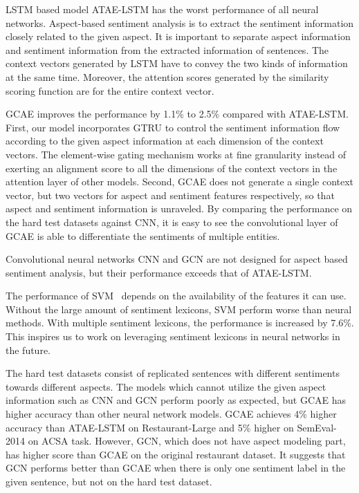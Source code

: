 \documentclass[11pt,a4paper]{article}
\begin{document}
LSTM based model ATAE-LSTM has the worst performance of all neural networks. Aspect-based sentiment analysis is to extract the sentiment information closely related to the given aspect. It is important to separate aspect information and sentiment information from the extracted information of sentences. The context vectors generated by LSTM have to convey the two kinds of information at the same time. Moreover, the attention scores generated by the similarity scoring function are for the entire context vector. 

GCAE improves the performance by 1.1\% to 2.5\% compared with ATAE-LSTM. 
First, our model incorporates GTRU to control the sentiment information flow according to the given aspect information at each dimension of the context vectors. The element-wise gating mechanism works at fine granularity instead of exerting an alignment score to all the dimensions of the context vectors in the attention layer of other models.
Second, GCAE does not generate a single context vector, but two vectors for aspect and sentiment features respectively, so that aspect and sentiment information is unraveled. 
By comparing the performance on the hard test datasets against CNN, it is easy to see the convolutional layer of GCAE is able to differentiate the sentiments of multiple entities. 

Convolutional neural networks CNN and GCN are not designed for aspect based sentiment analysis, but their performance exceeds that of ATAE-LSTM.

The performance of SVM~\cite{Kiritchenko:2014jw} depends on the availability of the features it can use. Without 
the large amount of sentiment lexicons, SVM perform worse than neural methods. With multiple sentiment lexicons, the performance is increased by 7.6\%.  This inspires us to work on leveraging sentiment lexicons in neural networks in the future.

The hard test datasets consist of replicated sentences with different sentiments towards different aspects. 
The models which cannot utilize the given aspect information such as CNN and GCN perform poorly as expected, but GCAE  has higher accuracy than other neural network models. GCAE achieves  4\% higher accuracy than ATAE-LSTM on Restaurant-Large and 5\% higher on SemEval-2014 on ACSA task. However, GCN, which does not have aspect modeling part, has higher score than GCAE on the original restaurant dataset. It suggests that GCN performs better than GCAE when there is only one sentiment label in the given sentence, but not on the hard test dataset. 
\end{document}
